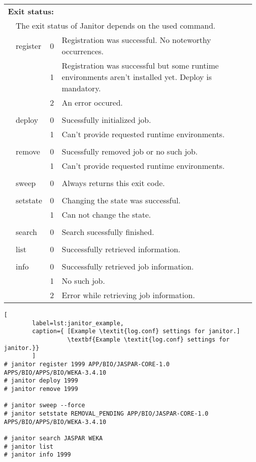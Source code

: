 \begin{table}[!h]
   \begin{center}
        \label{tab:janitor_commandline_exit_status}
	\begin{tabular}{p{0.5cm}p{2cm}p{0.5cm}p{11cm}}
	\multicolumn{3}{l}{\textbf{Exit status:}} \\
	&\multicolumn{3}{l}{The exit status of Janitor depends on the used command.} \\
	&	register			& 0 & Registration was successful. No noteworthy occurrences.\\
	&					& 1 & Registration was successful but some runtime environments aren't installed yet. Deploy is mandatory.\\ 
	&					& 2 & An error occured.\\
	&					&   &\\
	&	deploy				& 0 & Sucessfully initialized job.\\
	&					& 1 & Can't provide requested runtime environments.\\ 
	&					&   &\\
	&	remove				& 0 & Sucessfully removed job or no such job.\\
	&					& 1 & Can't provide requested runtime environments.\\ 
	&					&   &\\
	&	sweep				& 0 & Always returns this exit code.\\
	&					&   &\\
	&	setstate			& 0 & Changing the state was successful.\\
	&					& 1 & Can not change the state.\\ 
	&					&   &\\
	&	search				& 0 & Search sucessfully finished.\\
	&					&   &\\
	&	list				& 0 & Successfully retrieved information.\\
	&					&   &\\
	&	info				& 0 & Successfully retrieved job information.\\
	&					& 1 & No such job.\\ 
	&					& 2 & Error while retrieving job information.\\
	\end{tabular} 
   \end{center}
\end{table}


\begin{lstlisting}[
        label=lst:janitor_example,
        caption={ [Example \textit{log.conf} settings for janitor.]
                  \textbf{Example \textit{log.conf} settings for janitor.}}
        ]
# janitor register 1999 APP/BIO/JASPAR-CORE-1.0 APPS/BIO/APPS/BIO/WEKA-3.4.10
# janitor deploy 1999
# janitor remove 1999

# janitor sweep --force
# janitor setstate REMOVAL_PENDING APP/BIO/JASPAR-CORE-1.0 APPS/BIO/APPS/BIO/WEKA-3.4.10

# janitor search JASPAR WEKA
# janitor list
# janitor info 1999
\end{lstlisting}

